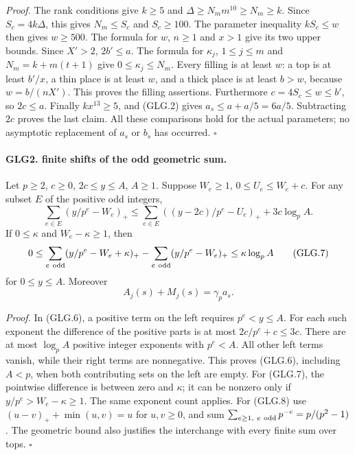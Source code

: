 \emph{Proof.}
The rank conditions give \(k\ge5\) and
\(\Delta\ge N_m m^{10}\ge N_m\ge k\).
Since \(S_c=4k\Delta\), this gives \(N_m\le S_c\) and
\(S_c\ge100\). The parameter inequality \(kS_c\le w\)
then gives \(w\ge500\). The formula for \(w\), \(n\ge1\)
and \(x>1\) give its two upper bounds. Since \(X'>2\),
\(2b'\le a\). The formula for \(\kappa_j\), \(1\le j\le m\)
and \(N_m=k+m(t+1)\) give \(0\le\kappa_j\le N_m\).
Every filling is at least \(w\): a top is at least \(b'/x\),
a thin place is at least \(w\), and a thick place is at least
\(b>w\), because \(w=b/(nX')\). This proves the filling assertions.
Furthermore \(c=4S_c\le w\le b'\), so \(2c\le a\).
Finally \(kx^{13}\ge5\), and (GLG.2) gives
\(a_s\le a+a/5=6a/5\). Subtracting \(2c\) proves the last
claim. All these comparisons hold for the actual parameters;
no asymptotic replacement of \(a_s\) or \(b_s\) has occurred.
\hfill\(\square\)

\paragraph{GLG2. finite shifts of the odd geometric sum.}
\label{claim:GLG2}
Let \(p\ge2\), \(c\ge0\), \(2c\le y\le A\), \(A\ge1\).
Suppose \(W_e\ge1\), \(0\le U_e\le W_e+c\). For any subset
\(E\) of the positive odd integers,
\[
 \sum_{e\in E}(y/p^e-W_e)_+
 \le\sum_{e\in E}((y-2c)/p^e-U_e)_+
                                  +3c\log_p A.                    \tag{GLG.6}
\]
If \(0\le\kappa\) and \(W_e-\kappa\ge1\), then
\[
 0\le\sum_{e\ {\rm odd}}(y/p^e-W_e+\kappa)_+
             -\sum_{e\ {\rm odd}}(y/p^e-W_e)_+
                      \le\kappa\log_p A                           \tag{GLG.7}
\]
for \(0\le y\le A\). Moreover
\[
              A_j(s)+M_j(s)=\gamma_p a_s .                         \tag{GLG.8}
\]

\emph{Proof.}
In (GLG.6), a positive term on the left requires \(p^e<y\le A\).
For each such exponent the difference of the positive parts is at
most \(2c/p^e+c\le3c\). There are at most \(\log_p A\)
positive integer exponents with \(p^e<A\). All other left terms
vanish, while their right terms are nonnegative. This proves
(GLG.6), including \(A<p\), when both contributing sets on the left
are empty. For (GLG.7), the pointwise difference is between zero
and \(\kappa\); it can be nonzero only if
\(y/p^e>W_e-\kappa\ge1\). The same exponent count applies.
For (GLG.8) use
\((u-v)_++\min(u,v)=u\) for \(u,v\ge0\), and sum
\(\sum_{e\ge1,\ e\ {\rm odd}}p^{-e}=p/(p^2-1)\).
The geometric bound also justifies the interchange with every
finite sum over tops.
\hfill\(\square\)

